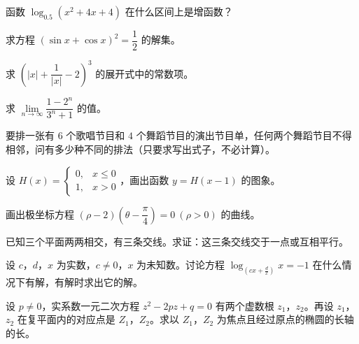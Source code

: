 \begin{question}
函数 $\log_{0.5}(x^2+4x+4)$ 在什么区间上是增函数？

\end{question}
\begin{question}
求方程 $(\sin x+\cos x)^2=\dfrac12$ 的解集。

\end{question}
\begin{question}
求 $\left(|x|+\dfrac{1}{|x|}-2\right)^3$ 的展开式中的常数项。

\end{question}
\begin{question}
求 $\lim\limits_{n\to\infty}\dfrac{1-2^n}{3^n+1}$ 的值。

\end{question}
\begin{question}
要排一张有 $6$ 个歌唱节目和 $4$ 个舞蹈节目的演出节目单，任何两个舞蹈节目不得相邻，问有多少种不同的排法（只要求写出式子，不必计算）。

\end{question}
\begin{question}
设 $H(x)=\begin{cases}0,&x\leqslant0\\1,&x>0\end{cases}$，画出函数 $y=H(x-1)$ 的图象。

\end{question}
\begin{question}
画出极坐标方程 $(\rho-2)\left(\theta-\dfrac\pi4\right)=0\ (\rho>0)$ 的曲线。

\end{question}
\begin{question}
已知三个平面两两相交，有三条交线。求证：这三条交线交于一点或互相平行。

\end{question}
\begin{question}
设 $c$，$d$，$x$ 为实数，$c\ne0$，$x$ 为未知数。讨论方程 $\log_{\left(cx+\frac dx\right)}x=-1$ 在什么情况下有解，有解时求出它的解。

\end{question}
\begin{question}
设 $p\ne0$，实系数一元二次方程 $z^2-2pz+q=0$ 有两个虚数根 $z_1$，$z_2$。再设 $z_1$，$z_2$ 在复平面内的对应点是 $Z_1$，$Z_2$。求以 $Z_1$，$Z_2$ 为焦点且经过原点的椭圆的长轴的长。

\end{question}
